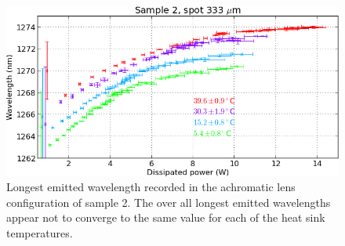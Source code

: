 \begin{figure}
\centering
\includegraphics[width=14.5cm]{img/lambda_sampled6.png}
\caption{Longest emitted wavelength
recorded in the achromatic lens configuration
of sample 2.
The over all longest emitted wavelengths
appear not to converge
to the same value
for each of the heat sink temperatures.}
\label{img:lambda_sampled6}
\end{figure}